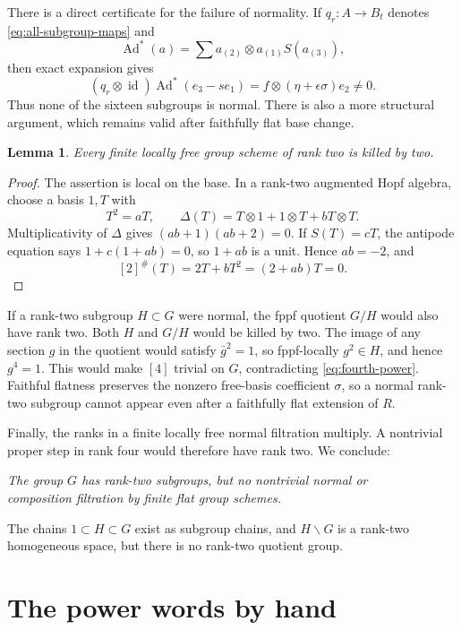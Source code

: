 \documentclass[11pt]{article}
\newtheorem{lemma}[theorem]{Lemma}
\theoremstyle{remark}
\newcommand{\Ad}{\operatorname{Ad}}
\newcommand{\id}{\operatorname{id}}
\begin{document}
There is a direct certificate for the failure of normality.  If
\(q_r:A\to B_t\) denotes \eqref{eq:all-subgroup-maps} and
\[
 \Ad^*(a)=\sum a_{(2)}\otimes a_{(1)}S(a_{(3)}),
\]
then exact expansion gives
\begin{equation}\label{eq:all-nonnormal-certificate}
 (q_r\otimes\id)\Ad^*(e_3-se_1)
 =f\otimes(\eta+\epsilon\sigma)e_2\ne0.
\end{equation}
Thus none of the sixteen subgroups is normal.  There is also a more
structural argument, which remains valid after faithfully flat base change.

\begin{lemma}\label{lem:rank-two-killed-two}
Every finite locally free group scheme of rank two is killed by two.
\end{lemma}

\begin{proof}
The assertion is local on the base.  In a rank-two augmented Hopf algebra,
choose a basis \(1,T\) with
\[
 T^2=aT,\qquad
 \Delta(T)=T\otimes1+1\otimes T+bT\otimes T.
\]
Multiplicativity of \(\Delta\) gives
\((ab+1)(ab+2)=0\).  If \(S(T)=cT\), the antipode equation says
\(1+c(1+ab)=0\), so \(1+ab\) is a unit.  Hence \(ab=-2\), and
\[
 [2]^\#(T)=2T+bT^2=(2+ab)T=0.
\]
\end{proof}

If a rank-two subgroup \(H\subset G\) were normal, the fppf quotient
\(G/H\) would also have rank two.  Both \(H\) and \(G/H\) would be killed
by two.  The image of any section \(g\) in the quotient would satisfy
\(\bar g^2=1\), so fppf-locally \(g^2\in H\), and hence \(g^4=1\).
This would make \([4]\) trivial on \(G\), contradicting
\eqref{eq:fourth-power}.  Faithful flatness preserves the nonzero free-basis
coefficient \(\sigma\), so a normal rank-two subgroup cannot appear even
after a faithfully flat extension of \(R\).

Finally, the ranks in a finite locally free normal filtration multiply.
A nontrivial proper step in rank four would therefore have rank two.  We
conclude:
\begin{center}
\emph{The group \(G\) has rank-two subgroups, but no nontrivial normal or}\\
\emph{composition filtration by finite flat group schemes.}
\end{center}
The chains \(1\subset H\subset G\) exist as subgroup chains, and
\(H\backslash G\) is a rank-two homogeneous space, but there is no
rank-two quotient group.

\section{The power words by hand}\label{sec:powers}
\end{document}

